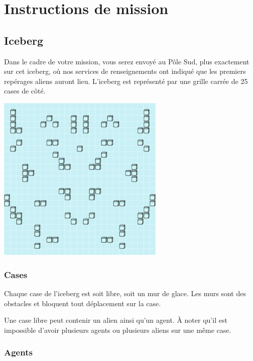\section{Instructions de mission}\label{instructions-de-mission}

\subsection{Iceberg}\label{iceberg}

Dans le cadre de votre mission, vous serez envoyé au Pôle Sud, plus
exactement sur cet iceberg, où nos services de renseignements ont
indiqué que les premiers repérages aliens auront lieu. L'iceberg est
représenté par une grille carrée de 25 cases de côté.

\begin{center}
\includegraphics[width=8cm]{../subject/img/map.png}
\end{center}

\subsubsection{Cases}\label{cases}

Chaque case de l'iceberg est soit libre, soit un mur de glace. Les murs
sont des obstacles et bloquent tout déplacement sur la case.

Une case libre peut contenir un alien ainsi qu'un agent. À noter qu'il
est impossible d'avoir plusieurs agents ou plusieurs aliens sur une même
case.

\subsubsection{Agents}\label{agents}

